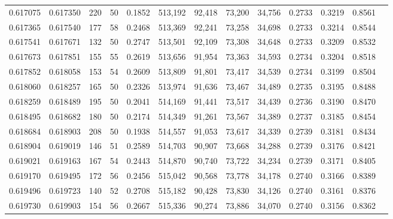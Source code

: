 \begin{tabular}{rrrrrrrrrrrrr}
0.617075 & 0.617350 &   220 &  50 &                                     0.1852 & 513,192 &  92,418 &  73,200 &  34,756 & 0.2733 & 0.3219 & 0.8561 \\
0.617365 & 0.617540 &   177 &  58 &                                     0.2468 & 513,369 &  92,241 &  73,258 &  34,698 & 0.2733 & 0.3214 & 0.8544 \\
0.617541 & 0.617671 &   132 &  50 &                                     0.2747 & 513,501 &  92,109 &  73,308 &  34,648 & 0.2733 & 0.3209 & 0.8532 \\
0.617673 & 0.617851 &   155 &  55 &                                     0.2619 & 513,656 &  91,954 &  73,363 &  34,593 & 0.2734 & 0.3204 & 0.8518 \\
0.617852 & 0.618058 &   153 &  54 &                                     0.2609 & 513,809 &  91,801 &  73,417 &  34,539 & 0.2734 & 0.3199 & 0.8504 \\
0.618060 & 0.618257 &   165 &  50 &                                     0.2326 & 513,974 &  91,636 &  73,467 &  34,489 & 0.2735 & 0.3195 & 0.8488 \\
0.618259 & 0.618489 &   195 &  50 &                                     0.2041 & 514,169 &  91,441 &  73,517 &  34,439 & 0.2736 & 0.3190 & 0.8470 \\
0.618495 & 0.618682 &   180 &  50 &                                     0.2174 & 514,349 &  91,261 &  73,567 &  34,389 & 0.2737 & 0.3185 & 0.8454 \\
0.618684 & 0.618903 &   208 &  50 &                                     0.1938 & 514,557 &  91,053 &  73,617 &  34,339 & 0.2739 & 0.3181 & 0.8434 \\
0.618904 & 0.619019 &   146 &  51 &                                     0.2589 & 514,703 &  90,907 &  73,668 &  34,288 & 0.2739 & 0.3176 & 0.8421 \\
0.619021 & 0.619163 &   167 &  54 &                                     0.2443 & 514,870 &  90,740 &  73,722 &  34,234 & 0.2739 & 0.3171 & 0.8405 \\
0.619170 & 0.619495 &   172 &  56 &                                     0.2456 & 515,042 &  90,568 &  73,778 &  34,178 & 0.2740 & 0.3166 & 0.8389 \\
0.619496 & 0.619723 &   140 &  52 &                                     0.2708 & 515,182 &  90,428 &  73,830 &  34,126 & 0.2740 & 0.3161 & 0.8376 \\
0.619730 & 0.619903 &   154 &  56 &                                     0.2667 & 515,336 &  90,274 &  73,886 &  34,070 & 0.2740 & 0.3156 & 0.8362 \\

\end{tabular}
